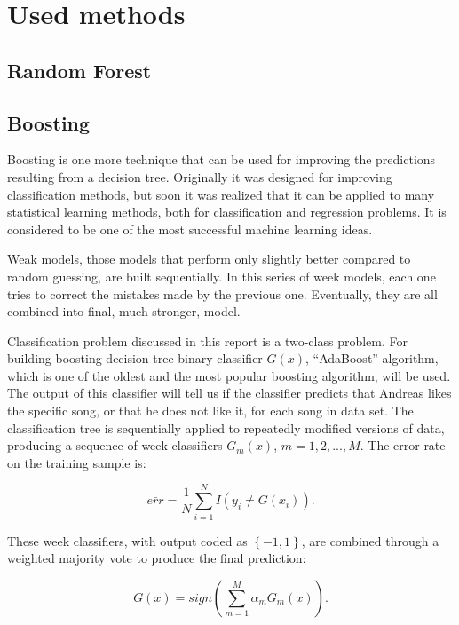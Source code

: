 \documentclass{article}
\begin{document}
\section{Used methods}

\subsection{Random Forest}

\subsection{Boosting}

Boosting is one more technique that can be used for improving the predictions resulting from a decision tree. Originally it was designed for improving classification methods, but soon it was realized that it can be applied to many statistical learning methods, both for classification and regression problems. It is considered to be one of the most successful machine learning ideas.

Weak models, those models that perform only slightly better compared to random guessing, are built sequentially. In this series of week models, each one tries to correct the mistakes made by the previous one. Eventually, they are all combined into final, much stronger, model. 

Classification problem discussed in this report is a two-class problem. For building boosting decision tree binary classifier $G(x)$, ``AdaBoost'' algorithm, which is one of the oldest and the most popular boosting algorithm, will be used. The output of this classifier will tell us if the classifier predicts that Andreas likes the specific song, or that he does not like it, for each song in data set. The classification tree is sequentially applied to repeatedly modified versions of data, producing a sequence of week classifiers $G_m(x)$, $m=1,2,...,M$. The error rate on the training sample is:

\begin{equation} \label{boost_error_rate}
\bar{err}=\frac{1}{N}\sum_{i=1}^{N}I(y_i\neq G(x_i)).
\end{equation}

These week classifiers, with output coded as $\left\{-1,1\right\}$, are combined through a weighted
majority vote to produce the final prediction:

\begin{equation} \label{boost_final_pred}
G(x)=sign(\sum_{m=1}^{M}\alpha_m G_m(x)).
\end{equation}
\end{document}
